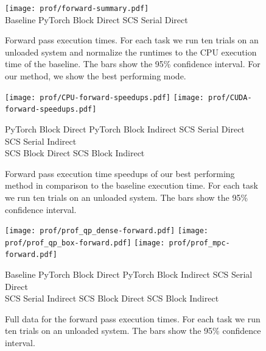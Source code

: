 
\begin{figure}[t]
  \centering
  \texttt{[image: prof/forward-summary.pdf]} \\
   Baseline \enskip
   PyTorch Block Direct \enskip
   SCS Serial Direct
  \caption{
    Forward pass execution times.
    For each task we run ten trials
    on an unloaded system and normalize the runtimes to the
    CPU execution time of the baseline.
    The bars show the 95\% confidence interval.
    For our method, we show the best performing mode.
  }
  \label{fig:eval:fwd}
\end{figure}


\begin{figure}[!h]
  \centering
  \texttt{[image: prof/CPU-forward-speedups.pdf]}
  \texttt{[image: prof/CUDA-forward-speedups.pdf]}

   PyTorch Block Direct \enskip
   PyTorch Block Indirect \enskip
   SCS Serial Direct \enskip
   SCS Serial Indirect \\
   SCS Block Direct \enskip
   SCS Block Indirect

  \caption{
    Forward pass execution time speedups of our best
    performing method in comparison to the baseline execution time.
    For each task we run ten trials on an unloaded system.
    The bars show the 95\% confidence interval.
  }
  \label{fig:eval:fwd:speedups}
\end{figure}

\begin{figure}[!h]
  \centering
  \texttt{[image: prof/prof\_qp\_dense-forward.pdf]}
  \texttt{[image: prof/prof\_qp\_box-forward.pdf]}
  \texttt{[image: prof/prof\_mpc-forward.pdf]}

   Baseline \enskip
   PyTorch Block Direct \enskip
   PyTorch Block Indirect \enskip
   SCS Serial Direct \\
   SCS Serial Indirect \enskip
   SCS Block Direct \enskip
   SCS Block Indirect

  \caption{Full data for the forward pass execution times.
    For each task we run ten trials on an unloaded system.
    The bars show the 95\% confidence interval.
  }
  \label{fig:eval:fwd:all}
\end{figure}

